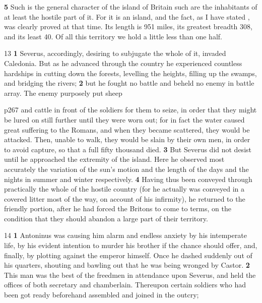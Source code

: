 \textbf{5} Such is the general character of the island of Britain such are the inhabitants of at least the hostile part of it. For it is an island, and the fact, as I have stated , was clearly proved at that time. Its length is 951 miles, its greatest breadth 308, and its least 40. Of all this territory we hold a little less than one half.

13
\textbf{1} Severus, accordingly, desiring to subjugate the whole of it, invaded Caledonia. But as he advanced through the country he experienced countless hardships in cutting down the forests, levelling the heights, filling up the swamps, and bridging the rivers; \textbf{2} but he fought no battle and beheld no enemy in battle array. The enemy purposely put sheep

p267 and cattle in front of the soldiers for them to seize, in order that they might be lured on still further until they were worn out; for in fact the water caused great suffering to the Romans, and when they became scattered, they would be attacked. Then, unable to walk, they would be slain by their own men, in order to avoid capture, so that a full fifty thousand died. \textbf{3} But Severus did not desist until he approached the extremity of the island. Here he observed most accurately the variation of the sun's motion and the length of the days and the nights in summer and winter respectively. \textbf{4} Having thus been conveyed through practically the whole of the hostile country (for he actually was conveyed in a covered litter most of the way, on account of his infirmity), he returned to the friendly portion, after he had forced the Britons to come to terms, on the condition that they should abandon a large part of their territory.

14
\textbf{1} Antoninus was causing him alarm and endless anxiety by his intemperate life, by his evident intention to murder his brother if the chance should offer, and, finally, by plotting against the emperor himself. Once he dashed suddenly out of his quarters, shouting and bawling out that he was being wronged by Castor. \textbf{2} This man was the best of the freedmen in attendance upon Severus, and held the offices of both secretary and chamberlain. Thereupon certain soldiers who had been got ready beforehand assembled and joined in the outcry;


